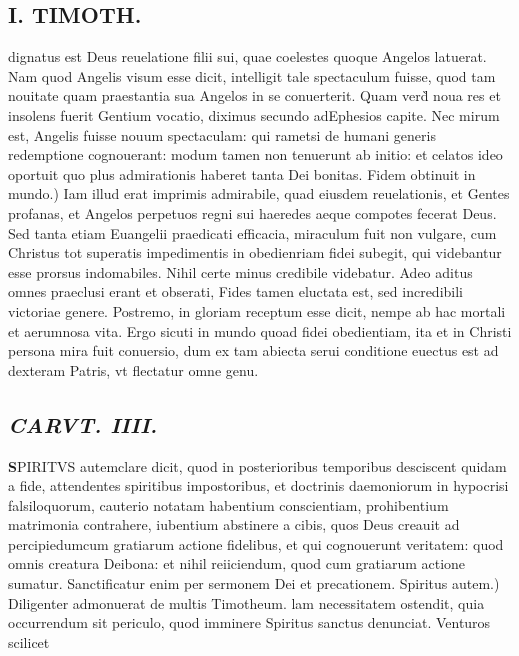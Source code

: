 \documentclass{article}
\begin{document}
\begin{pages}
\section*{I. TIMOTH. }
\marginpar{[ p.42 ]}\pstart dignatus est Deus reuelatione filii sui, quae coelestes quoque Angelos latuerat. Nam quod Angelis visum esse dicit, intelligit tale spectaculum fuisse, quod tam nouitate quam praestantia sua Angelos in se conuerterit. Quam verd̀ noua res et insolens fuerit Gentium vocatio, diximus secundo adEphesios capite. Nec mirum est, Angelis fuisse nouum spectaculam: qui rametsi de humani generis redemptione cognouerant: modum tamen non tenuerunt ab initio: et celatos ideo oportuit quo plus admirationis haberet tanta Dei bonitas.  \pend\pstart Fidem obtinuit in mundo.) Iam illud erat imprimis admirabile, quad eiusdem reuelationis, et Gentes profanas, et Angelos perpetuos regni sui haeredes aeque compotes fecerat Deus. Sed tanta etiam Euangelii praedicati efficacia, miraculum fuit non vulgare, cum Christus tot superatis impedimentis in obedienriam fidei subegit, qui videbantur esse prorsus indomabiles. Nihil certe minus credibile videbatur. Adeo aditus omnes praeclusi erant et obserati, Fides tamen eluctata est, sed incredibili victoriae genere. Postremo, in gloriam receptum esse dicit, nempe ab hac mortali et aerumnosa vita. Ergo sicuti in mundo quoad fidei obedientiam, ita et in Christi persona mira fuit conuersio, dum ex tam abiecta serui conditione euectus est ad dexteram Patris, vt flectatur omne genu.  \pend
{}
{}
\subsection*{\textit{CARVT. IIII. }}\pstart \huge\textbf{S}\normalsize PIRITVS autemclare dicit, quod in posterioribus temporibus desciscent quidam a fide, attendentes spiritibus impostoribus, et doctrinis daemoniorum in hypocrisi falsiloquorum, cauterio notatam habentium conscientiam, prohibentium matrimonia contrahere, iubentium abstinere a cibis, quos Deus creauit ad percipiedumcum gratiarum actione fidelibus, et qui cognouerunt veritatem: quod omnis creatura Deibona: et nihil reiiciendum, quod cum gratiarum actione sumatur. Sanctificatur enim per sermonem Dei et precationem.  \pend\pstart Spiritus autem.) Diligenter admonuerat de multis Timotheum. lam necessitatem ostendit, quia occurrendum sit periculo, quod imminere Spiritus sanctus denunciat. Venturos scilicet  \pend
{}
{}

\end{pages}
\end{document}
